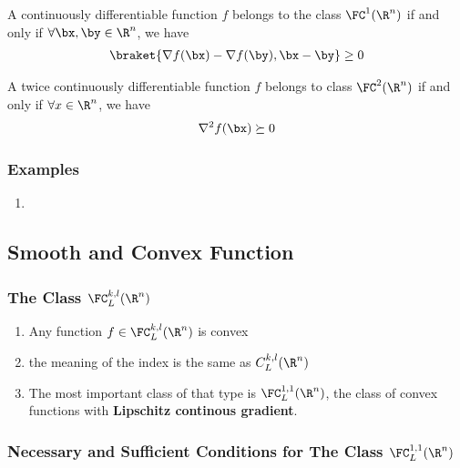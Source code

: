 \begin{theorem}
    A continuously differentiable function $f$ belongs to the class $\FC^1(\R^n)$ if and only if $\forall \bx,\by\in \R^n$, we have
    \begin{align*}
        \braket{\nabla f(\bx)-\nabla f(\by), \bx-\by}\ge 0
    \end{align*}
\end{theorem}


\begin{theorem}
    A twice continuously  differentiable function $f$ belongs to class $\FC^2(\R^n)$ if and only if $\forall x\in \R^n$, we have
    \begin{align*}
        \nabla^2f(\bx)\succeq 0
    \end{align*}
\end{theorem}

\subsubsection{Examples}
\begin{enumerate}
    \item 
\end{enumerate}



\subsection{Smooth and Convex Function}
\subsubsection{The Class \texorpdfstring{$\FC_L^{k,l}(\R^n)$}.}
\begin{enumerate}
    \item Any function $f\in \FC_L^{k,l}(\R^n)$ is convex
    \item the meaning of the index is the same as $C_L^{k,l}(\R^n)$
    \item The most important class of that type is $\FC_L^{1,1}(\R^n)$, the class of convex functions with \textbf{Lipschitz continous gradient}. 
\end{enumerate}

\subsubsection{Necessary and Sufficient Conditions for The Class \texorpdfstring{$\FC_L^{1,1}(\R^n)$}.}

